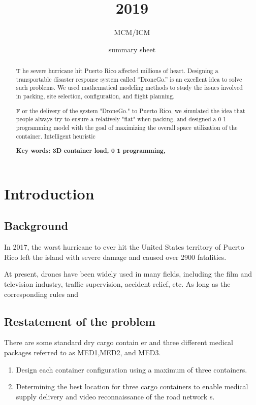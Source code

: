 \documentclass[a4paper,12pt]{article}
\begin{document}
	\title{2019}
	\author{MCM/ICM}
	\date{summary sheet}
	\maketitle
	\tableofcontents
	\newpage
	\begin{abstract}
T he severe hurricane hit Puerto Rico affected millions of heart. Designing a transportable
disaster response system called “DroneGo.” is an excellent idea to solve such problems. We
used mathematical modeling methods to study the issues involved in packing, site selection,
configuration, and flight planning.

F or the delivery of the system "DroneGo." to Puerto Rico, we simulated the idea that people
always try to ensure a relatively "flat" when packing, and designed a 0 1 programming model
with the goal of maximizing the overall space utilization of the container. Intelligent heuristic

	\textbf{Key words: 3D container load, 0 1 programming, }
	
	\end{abstract}
	\section{Introduction}
	\subsection{Background}
In 2017, the worst hurricane to ever hit the United States territory of Puerto Rico left the
island with severe damage and caused over 2900 fatalities.

At present, drones have been widely used in many fields, including the film and television
industry, traffic supervision, accident relief, etc. As long as the corresponding rules and
	\subsection{Restatement of the problem}
There are some standard dry cargo contain
er and three different medical packages referred
to as MED1,MED2, and MED3.
	\begin{enumerate}
		\item Design each container configuration using a maximum of three containers.
		\item Determining the best location for three cargo containers to enable medical supply delivery
		and video reconnaissance of the road network s.
	\end{enumerate}
\end{document}
